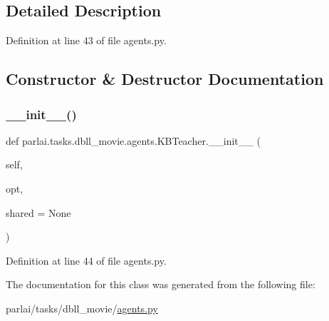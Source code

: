 \subsection{Detailed Description}


Definition at line 43 of file agents.\+py.



\subsection{Constructor \& Destructor Documentation}
\mbox{\label{classparlai_1_1tasks_1_1dbll__movie_1_1agents_1_1KBTeacher_a073db440502a585121d5207fc9d9f992}} 
\subsubsection{\texorpdfstring{\+\_\+\+\_\+init\+\_\+\+\_\+()}{\_\_init\_\_()}}
{\footnotesize\ttfamily def parlai.\+tasks.\+dbll\+\_\+movie.\+agents.\+K\+B\+Teacher.\+\_\+\+\_\+init\+\_\+\+\_\+ (\begin{DoxyParamCaption}\item[{}]{self,  }\item[{}]{opt,  }\item[{}]{shared = {\ttfamily None} }\end{DoxyParamCaption})}



Definition at line 44 of file agents.\+py.



The documentation for this class was generated from the following file\+:\begin{DoxyCompactItemize}
\item 
parlai/tasks/dbll\+\_\+movie/\hyperlink{parlai_2tasks_2dbll__movie_2agents_8py}{agents.\+py}\end{DoxyCompactItemize}
